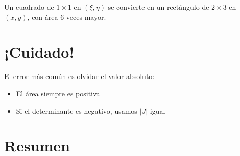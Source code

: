 \documentclass{article}
\begin{document}
Un cuadrado de $1 \times 1$ en $(\xi,\eta)$ se convierte en un rectángulo de $2 \times 3$ en $(x,y)$, con área 6 veces mayor.

\section{¡Cuidado!}

El error más común es olvidar el valor absoluto:
\begin{itemize}
\item El área siempre es positiva
\item Si el determinante es negativo, usamos $|J|$ igual
\end{itemize}

\section{Resumen}

\begin{center}
\end{center}
\end{document}
